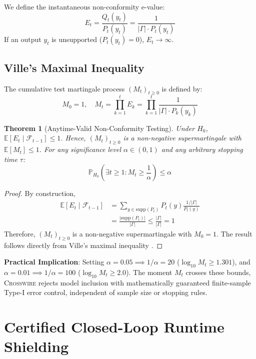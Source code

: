 \documentclass[10pt,twocolumn,letterpaper]{article}
\newtheorem{theorem}{Theorem}
\begin{document}
We define the instantaneous non-conformity e-value:
\begin{equation}
    E_t = \frac{Q_t(y_t)}{P_t(y_t)} = \frac{1}{|\Gamma| \cdot P_t(y_t)}
\end{equation}
If an output $y_t$ is unsupported ($P_t(y_t) = 0$), $E_t \to \infty$.

\subsection{Ville's Maximal Inequality}
The cumulative test martingale process $(M_t)_{t \ge 0}$ is defined by:
\begin{equation}
    M_0 = 1, \quad M_t = \prod_{k=1}^t E_k = \prod_{k=1}^t \frac{1}{|\Gamma| \cdot P_k(y_k)}
\end{equation}

\begin{theorem}[Anytime-Valid Non-Conformity Testing]
Under $H_0$, $\mathbb{E}[E_t \mid \mathcal{F}_{t-1}] \le 1$. Hence, $(M_t)_{t \ge 0}$ is a non-negative supermartingale with $\mathbb{E}[M_t] \le 1$. For any significance level $\alpha \in (0, 1)$ and any arbitrary stopping time $\tau$:
\begin{equation}
    \mathbb{P}_{H_0}\left( \exists t \ge 1 : M_t \ge \frac{1}{\alpha} \right) \le \alpha
\end{equation}
\end{theorem}

\begin{proof}
By construction,
\begin{align*}
    \mathbb{E}[E_t \mid \mathcal{F}_{t-1}] &= \sum_{y \in \text{supp}(P_t)} P_t(y) \frac{1 / |\Gamma|}{P_t(y)} \\
    &= \frac{|\text{supp}(P_t)|}{|\Gamma|} \le \frac{|\Gamma|}{|\Gamma|} = 1
\end{align*}
Therefore, $(M_t)_{t \ge 0}$ is a non-negative supermartingale with $M_0 = 1$. The result follows directly from Ville's maximal inequality \cite{ville1939etude}.
\end{proof}

\textbf{Practical Implication}: Setting $\alpha = 0.05 \implies 1/\alpha = 20$ ($\log_{10} M_t \ge 1.301$), and $\alpha = 0.01 \implies 1/\alpha = 100$ ($\log_{10} M_t \ge 2.0$). The moment $M_t$ crosses these bounds, \textsc{Crosswire} rejects model inclusion with mathematically guaranteed finite-sample Type-I error control, independent of sample size or stopping rules.

\section{Certified Closed-Loop Runtime Shielding}
\label{sec:shield}
\end{document}
